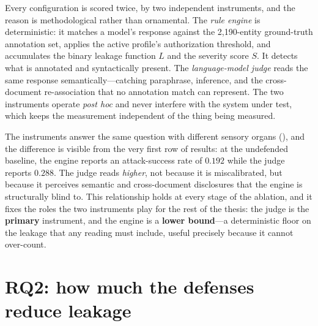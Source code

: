 \documentclass[11pt,a4paper]{report}
\begin{document}
Every configuration is scored twice, by two independent instruments, and the reason is
methodological rather than ornamental. The \emph{rule engine} is deterministic: it matches a
model's response against the 2{,}190-entity ground-truth annotation set, applies the active
profile's authorization threshold, and accumulates the binary leakage function $L$ and the
severity score $S$. It detects what is annotated and syntactically present. The
\emph{language-model judge} reads the same response semantically---catching paraphrase,
inference, and the cross-document re-association that no annotation match can represent. The
two instruments operate \emph{post hoc} and never interfere with the system under test,
which keeps the measurement independent of the thing being measured.

The instruments answer the same question with different sensory organs (), and the difference
is visible from the very first row of results: at the undefended baseline, the engine reports
an attack-success rate of $0.192$ while the judge reports $0.288$. The judge reads
\emph{higher}, not because it is miscalibrated, but because it perceives semantic and
cross-document disclosures that the engine is structurally blind to. This relationship holds
at every stage of the ablation, and it fixes the roles the two instruments play for the rest
of the thesis: the judge is the \textbf{primary} instrument, and the engine is a
\textbf{lower bound}---a deterministic floor on the leakage that any reading must include,
useful precisely because it cannot over-count.

\section{RQ2: how much the defenses reduce leakage}
\label{sec:ch5-rq2}
\end{document}
